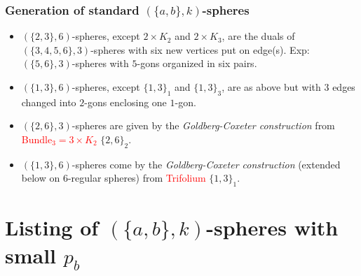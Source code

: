 \documentclass{beamer}
\begin{document}
\begin{frame}\frametitle{Generation of standard $(\{a,b\},k)$-spheres}
\begin{itemize}

\item $(\{2,3\},6)$-spheres, except $2\times K_2$ and $2\times K_3$, are
the duals of  $(\{3,4,5,6\},3)$-spheres with six new
vertices put on  edge(s).
Exp: $(\{5, 6\},3)$-spheres
with $5$-gons organized in six pairs.

\item $(\{1,3\},6)$-spheres, except $\{1,3\}_1$  and $\{1,3\}_3$,
are as above but
with $3$  edges changed
into
$2$-gons
enclosing one $1$-gon.

\item $(\{2,6\},3)$-spheres are given by the {\em Goldberg-Coxeter
construction}
from  \textcolor{red}{Bundle$_3=3\times K_2$} $\{2,6\}_{2}$.
\item
$(\{1,3\},6)$-spheres come by the {\em Goldberg-Coxeter
construction} (extended below on $6$-regular spheres)
from
 \textcolor{red}{Trifolium} $\{1,3\}_{1}$.

 \end{itemize}



\end{frame}

\section[]{Listing of $(\{a,b\},k)$-spheres with small $p_b$}

\end{document}
